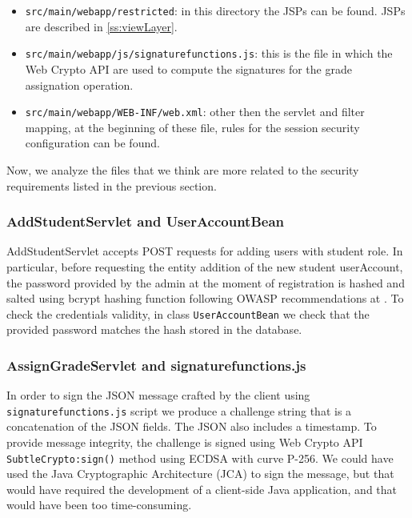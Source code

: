 \begin{itemize}
    \item \texttt{src/main/webapp/restricted}: in this directory the JSPs can be found. JSPs are described in \autoref{ss:viewLayer}.
    \item \texttt{src/main/webapp/js/signature\textunderscore functions.js}: this is the file in which the Web Crypto API are used to compute the signatures for the grade assignation operation.
    \item \texttt{src/main/webapp/WEB-INF/web.xml}: other then the servlet and filter mapping, at the beginning of these file, rules for the session security configuration can be found.
\end{itemize}

Now, we analyze the files that we think are more related to the security requirements listed in the previous section.

\subsubsection{AddStudentServlet and UserAccountBean}
\label{ss:AddStuServ}

AddStudentServlet accepts POST requests for adding users with student role. In particular, before requesting the entity addition of the new student userAccount, the password provided by the admin at the moment of registration is hashed and salted using bcrypt hashing function following OWASP recommendations at \cite{online:OWASPpass}. To check the credentials validity, in class \texttt{UserAccountBean} we check that the provided password matches the hash stored in the database.

\subsubsection{AssignGradeServlet and signature\textunderscore functions.js}
\label{ss:SignFunct}

In order to sign the JSON message crafted by the client using \texttt{signature\textunderscore functions.js} script we produce a challenge string that is a concatenation of the JSON fields. The JSON also includes a timestamp. To provide message integrity, the challenge is signed using Web Crypto API \texttt{SubtleCrypto:sign()} method using ECDSA with curve P-256. We could have used the Java Cryptographic Architecture (JCA) to sign the message, but that would have required the development of a client-side Java application, and that would have been too time-consuming. 

